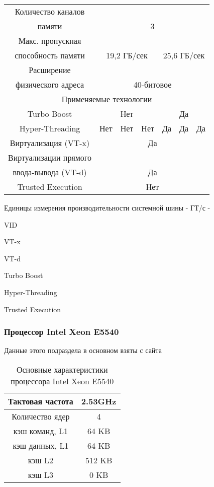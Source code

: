 \begin{center}
\begin{table}[ht]
\begin{tabular}{|c|c|c|c|c|c|c|}
		Количество каналов & \multicolumn{6}{c|}{} \\
		памяти & \multicolumn{6}{c|}{3} \\ \hline
		Макс. пропускная & \multicolumn{6}{c|}{} \\ \hline
		способность памяти & \multicolumn{3}{c|}{19,2 ГБ/сек} & \multicolumn{3}{c|}{25,6 ГБ/сек }\\ \hline
		Расширение         & \multicolumn{6}{c|}{} \\ 
		физического адреса & \multicolumn{6}{c|}{40-битовое} \\ \hline
		\multicolumn{7}{|c|}{Применяемые технологии} \\ \hline
		Turbo Boost & \multicolumn{3}{c|}{Нет} & \multicolumn{3}{c|}{Да} \\ \hline
		Hyper-Threading & Нет & Нет & Нет & Да & Да & Да \\ \hline
		Виртуализация (VT-x) & \multicolumn{6}{c|}{Да} \\ \hline
		Виртуализации прямого & \multicolumn{6}{c|}{} \\
		ввода-вывода (VT-d)   & \multicolumn{6}{c|}{ Да} \\ \hline
		Trusted Execution &   \multicolumn{6}{c|}{ Нет} \\ \hline
	\end{tabular}
\end{table}
\end{center}

Единицы измерения производительности системной шины - ГТ/с -

VID

VT-x

VT-d

Turbo Boost

Hyper-Threading

Trusted Execution



\subsubsection{Процессор Intel Xeon  E5540}
\label{app_E5540}
Данные этого подраздела в основном взяты с сайта \cite{geek_E5540}


\begin{table}[ht]
\begin{center}
\caption{Основные характеристики процессора Intel Xeon  E5540}
\begin{tabular}{|c|c|}
\hline	
Тактовая частота & 2.53GHz   \\ \hline
Количество ядер & 4 	     \\ \hline
кэш команд, L1 &  64 KB      \\ \hline
кэш данных, L1 &  64 KB       \\ \hline
кэш L2         &  512 KB      \\ \hline
кэш L3         &  0 KB        \\ \hline
\end{tabular}
\end{center} 	
\end{table} 	

